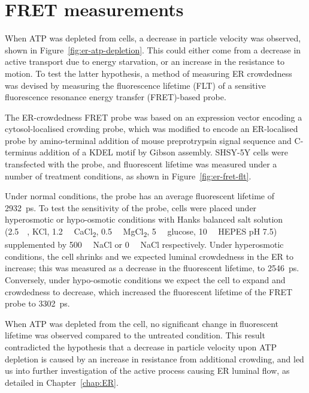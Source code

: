 \section{FRET measurements} \label{appn:fret}
When ATP was depleted from cells, a decrease in particle velocity was observed, shown in Figure~\ref{fig:er-atp-depletion}. 
This could either come from a decrease in active transport due to energy starvation, or an increase in the resistance to motion. 
To test the latter hypothesis, a method of measuring ER crowdedness was devised by measuring the fluorescence lifetime (FLT) of a sensitive fluorescence resonance energy transfer (FRET)-based probe. 

The ER-crowdedness FRET probe was based on an expression vector encoding a cytosol-localised crowding probe, which was modified to encode an ER-localised probe by amino-terminal addition of mouse preprotrypsin signal sequence and C-terminus addition of a KDEL motif by Gibson assembly. 
SHSY-5Y cells were transfected with the probe, and fluorescent lifetime was measured under a number of treatment conditions, as shown in Figure~\ref{fig:er-fret-flt}. %

Under normal conditions, the probe has an average fluorescent lifetime of \SI{2932}{\pico\second}. 
To test the sensitivity of the probe, cells were placed under hyperosmotic or hypo-osmotic conditions with Hanks balanced salt solution (\SI{2.5}{\milli\Molar}, KCl, \SI{1.2}{\milli\Molar} CaCl\textsubscript{2}, \SI{0.5}{\milli\Molar} MgCl\textsubscript{2}, \SI{5}{\milli\Molar} glucose, \SI{10}{\milli\Molar} HEPES pH 7.5) supplemented by \SI{500}{\milli\Molar} NaCl or \SI{0}{\milli\Molar} NaCl respectively. 
Under hyperosmotic conditions, the cell shrinks and we expected luminal crowdedness in the ER to increase; this was measured as a decrease in the fluorescent lifetime, 
to \SI{2546}{\pico\second}. 
Conversely, under hypo-osmotic conditions we expect the cell to expand and crowdedness to decrease, which increased the fluorescent lifetime of the FRET probe to \SI{3302}{\pico\second}. 

When ATP was depleted from the cell, no significant change in fluorescent lifetime was observed compared to the untreated condition. 
This result contradicted the hypothesis that a decrease in particle velocity upon ATP depletion is caused by an increase in resistance from additional crowding, and led us into further investigation of the active process causing ER luminal flow, as detailed in Chapter~\ref{chap:ER}. 

